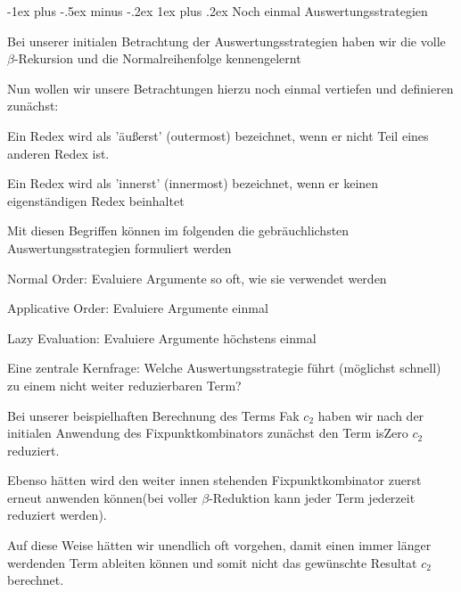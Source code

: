 \documentclass[10pt]{article}
\makeatletter
\renewcommand{\subsubsection}{\@startsection{subsubsection}{3}{0mm}%
                                {-1ex plus -.5ex minus -.2ex}%
                                {1ex plus .2ex}%
                                {\normalfont\small\bfseries}}
\makeatother
\begin{document}
  \subsubsection{Noch einmal Auswertungsstrategien}
  \begin{itemize*}
    \item Bei unserer initialen Betrachtung der Auswertungsstrategien haben wir die volle $\beta$-Rekursion und die Normalreihenfolge kennengelernt
    \item Nun wollen wir unsere Betrachtungen hierzu noch einmal vertiefen und definieren zunächst:
    \begin{itemize*}
      \item Ein Redex wird als \color{blue} 'äußerst' (outermost) \color{black} bezeichnet, wenn er nicht Teil eines anderen Redex ist.
      \item Ein Redex wird als \color{blue} 'innerst' (innermost) \color{black} bezeichnet, wenn er keinen eigenständigen Redex beinhaltet
    \end{itemize*}
    \item Mit diesen Begriffen können im folgenden die gebräuchlichsten Auswertungsstrategien formuliert werden
    \begin{itemize*}
      \item \color{blue} Normal Order: \color{black} Evaluiere Argumente so oft, wie sie verwendet werden
      \item \color{blue} Applicative Order: \color{black} Evaluiere Argumente einmal
      \item \color{blue} Lazy Evaluation: \color{black} Evaluiere Argumente höchstens einmal
    \end{itemize*}
    \item Eine zentrale Kernfrage: \color{blue} Welche Auswertungsstrategie führt (möglichst schnell) zu einem nicht weiter reduzierbaren Term?
    \color{black}
    \begin{itemize*}
      \item Bei unserer beispielhaften Berechnung des Terms Fak $c_2$ haben wir nach der initialen Anwendung des Fixpunktkombinators zunächst den Term isZero $c_2$ reduziert.
      \item Ebenso hätten wird den weiter innen stehenden Fixpunktkombinator zuerst erneut anwenden können(bei voller $\beta$-Reduktion kann jeder Term jederzeit reduziert werden).
      \item Auf diese Weise hätten wir unendlich oft vorgehen, damit einen immer länger werdenden Term ableiten können und somit nicht das gewünschte Resultat $c_2$ berechnet.

\end{itemize*}
\end{itemize*}
\end{document}
